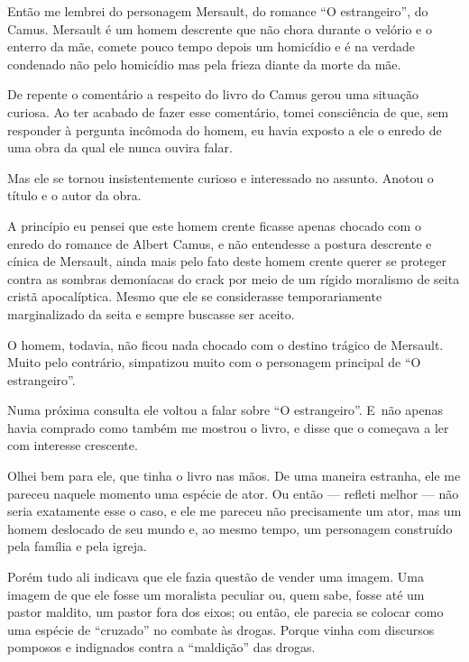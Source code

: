 Então me lembrei do personagem Mersault, do romance ``O estrangeiro'',
do Camus. Mersault é um homem descrente que não chora durante o velório
e o enterro da mãe, comete pouco tempo depois um homicídio e é na
verdade condenado não pelo homicídio mas pela frieza diante da morte da
mãe.

\asterisc{}

De repente o comentário a respeito do livro do Camus gerou uma situação
curiosa. Ao ter acabado de fazer esse comentário, tomei consciência de
que, sem responder à pergunta incômoda do homem, eu havia exposto a ele
o enredo de uma obra da qual ele nunca ouvira falar.

Mas ele se tornou insistentemente curioso e interessado no assunto.
Anotou o título e o autor da obra.

A princípio eu pensei que este homem crente ficasse apenas chocado com o
enredo do romance de Albert Camus, e não entendesse a postura descrente
e cínica de Mersault, ainda mais pelo fato deste homem crente querer se
proteger contra as sombras demoníacas do crack por meio de um rígido
moralismo de seita cristã apocalíptica. Mesmo que ele se considerasse
temporariamente marginalizado da seita e sempre buscasse ser aceito.

O homem, todavia, não ficou nada chocado com o destino trágico de
Mersault. Muito pelo contrário, simpatizou muito com o personagem
principal de ``O estrangeiro''.

\asterisc{}

Numa próxima consulta ele voltou a falar sobre ``O estrangeiro''. E~não
apenas havia comprado como também me mostrou o livro, e disse que o
começava a ler com interesse crescente.

Olhei bem para ele, que tinha o livro nas mãos. De uma maneira estranha,
ele me pareceu naquele momento uma espécie de ator. Ou então --- refleti
melhor --- não seria exatamente esse o caso, e ele me pareceu não
precisamente um ator, mas um homem deslocado de seu mundo e, ao mesmo
tempo, um personagem construído pela família e pela igreja.

Porém tudo ali indicava que ele fazia questão de vender uma imagem. Uma
imagem de que ele fosse um moralista peculiar ou, quem sabe, fosse até
um pastor maldito, um pastor fora dos eixos; ou então, ele parecia se
colocar como uma espécie de ``cruzado'' no combate às drogas. Porque
vinha com discursos pomposos e indignados contra a ``maldição'' das
drogas.

\asterisc{}


